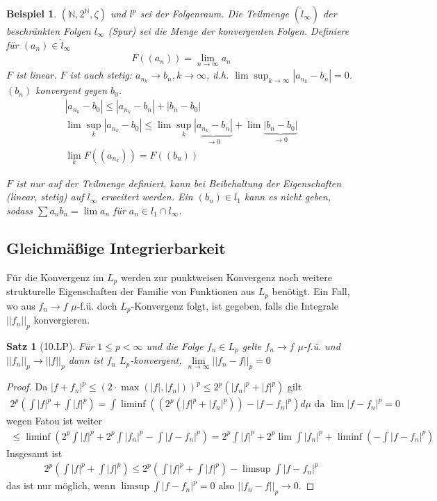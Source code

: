 \documentclass[]{article}
\newtheorem{theorem}{Satz}
\newtheorem*{example}{Beispiel}
\begin{document}
\begin{example}
	$(\mathbb{N}, 2^\mathbb{N}, \zeta)$ und $l^p$ sei der Folgenraum. Die Teilmenge $(\hat{l}_\infty)$ der beschränkten Folgen $l_\infty$ (Spur) sei die Menge der konvergenten Folgen. Definiere für $(a_n) \in \hat{l}_\infty$
	\begin{align*}
		F((a_n)) = \lim\limits_{n\rightarrow\infty} a_n
	\end{align*}
	$F$ ist linear. $F$ ist auch stetig:
	$a_{n_k} \rightarrow b_n, k\rightarrow\infty$, d.h. $\lim\sup_{k\rightarrow\infty} |a_{n_k}-b_n| = 0$. $(b_n)$ konvergent gegen $b_0$.
	\begin{align*}
		|a_{n_k} - b_0| \leq |a_{n_k} - b_n| + |b_n - b_0|\\
		\lim\sup_k |a_{n_k} - b_0| \leq \lim\sup_k \underbrace{|a_{n_k} - b_n|}_{\rightarrow0} + \lim \underbrace{|b_n - b_0|}_{\rightarrow 0}\\
		\lim_k F((a_{n_k})) = F((b_n))
	\end{align*}

	$F$ ist nur auf der Teilmenge definiert, kann bei Beibehaltung der Eigenschaften (linear, stetig) auf $l_\infty$ erweitert werden. Ein $(b_n) \in l_1$ kann es nicht geben, sodass $\sum a_n b_n = \lim a_n$ für $a_n \in l_1 \cap l_\infty$.
\end{example}

\subsection{Gleichmäßige Integrierbarkeit}
Für die Konvergenz im $L_p$ werden zur punktweisen Konvergenz noch weitere strukturelle Eigenschaften der Familie von Funktionen aus $L_p$ benötigt. Ein Fall, wo aus $f_n \rightarrow f$ $\mu$-f.ü. doch $L_p$-Konvergenz folgt, ist gegeben, falls die Integrale $||f_n||_p$ konvergieren.

\begin{theorem}[10.LP]
	Für $1\leq p < \infty$ und die Folge $f_n \in L_p$ gelte $f_n \rightarrow f$ $\mu$-f.ü. und $||f_n||_p \rightarrow ||f||_p$ dann ist $f_n$ $L_p$-konvergent, $\lim\limits_{n\rightarrow\infty} ||f_n - f||_p = 0$
\end{theorem}

\begin{proof}
	Da $|f+f_n|^p \leq (2\cdot \max(|f|, |f_n|))^p \leq 2^p (|f_n|^p + |f|^p)$ gilt
	\begin{align*}
		2^p (\int |f|^p + \int |f|^p) = \int \liminf \left((2^p(|f|^p+|f_n|^p))- |f-f_n|^p\right) d\mu \text{ da } \lim |f-f_n|^p = 0
	\end{align*}
	wegen Fatou ist weiter
	\begin{align*}
		\leq \liminf\left(2^p \int|f|^p + 2^p \int |f_n|^p - \int |f-f_n|^p\right) = 2^p \int |f|^p + 2^p \lim \int |f_n|^p + \liminf (-\int |f-f_n|^p)
	\end{align*}
	Insgesamt ist
	\begin{align*}
		2^p(\int|f|^p + \int|f|^p) \leq 2^p(\int|f|^p + \int |f|^p) - \limsup \int |f-f_n|^p
	\end{align*}
	das ist nur möglich, wenn $\limsup \int |f-f_n|^p=0$ also $||f_n-f||_p\rightarrow0$.
\end{proof}
\end{document}
